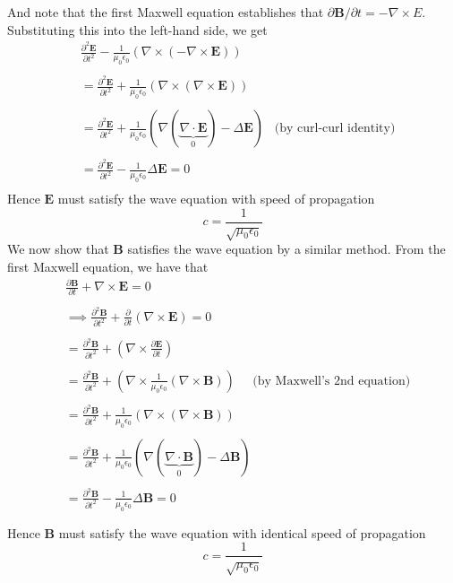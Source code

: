 \documentclass[12pt]{article}
\begin{document}
{And note that the first Maxwell equation establishes that $\partial \mathbf{B}/ \partial t = -\nabla \times E$. Substituting this into the left-hand side, we get \\
\begin{align*}
& \frac{\partial^2 \mathbf{E}}{\partial t^2} - \frac{1}{\mu_0 \epsilon_0} \left( \nabla \times \left( -\nabla \times \mathbf{E} \right) \right) \\ \\
&= \frac{\partial^2 \mathbf{E}}{\partial t^2} + \frac{1}{\mu_0 \epsilon_0} \left( \nabla \times \left( \nabla \times \mathbf{E} \right) \right) \\ \\
&= \frac{\partial^2 \mathbf{E}}{\partial t^2} + \frac{1}{\mu_0 \epsilon_0} \left( \nabla  ( \underbrace{\nabla \cdot \mathbf{E}}_{0}  ) - \Delta \mathbf{E}  \right) \;\;\; \text{(by curl-curl identity)} \\ \\
&= \frac{\partial^2 \mathbf{E}}{\partial t^2} - \frac{1}{\mu_0 \epsilon_0} \Delta \mathbf{E} = 0 \\
\end{align*}
Hence $\mathbf{E}$ must satisfy the wave equation with speed of propagation $$c = \frac{1}{\sqrt{\mu_0 \epsilon_0}}$$ 
We now show that $\mathbf{B}$ satisfies the wave equation by a similar method. From the first Maxwell equation, we have that \\
\[
\begin{aligned}
& \frac{\partial \mathbf{B}}{\partial t} + \nabla \times \mathbf{E} = 0 \\ \\
&\implies \frac{\partial^2 \mathbf{B}}{\partial t^2} + \frac{\partial}{\partial t} \left( \nabla \times \mathbf{E} \right) = 0 \\ \\
&= \frac{\partial^2 \mathbf{B}}{\partial t^2} + \left( \nabla \times \frac{\partial \mathbf{E}}{\partial t} \right)  \\ \\
&= \frac{\partial^2 \mathbf{B}}{\partial t^2} + \left( \nabla \times \frac{1}{\mu_0 \epsilon_0} (\nabla \times \mathbf{B}) \right) \;\;\;\;\; \text{(by Maxwell's 2nd equation)}  \\ \\
&= \frac{\partial^2 \mathbf{B}}{\partial t^2} + \frac{1}{\mu_0 \epsilon_0}  \left( \nabla \times (\nabla \times \mathbf{B}) \right) \\ \\
&= \frac{\partial^2 \mathbf{B}}{\partial t^2} + \frac{1}{\mu_0 \epsilon_0}  \left( \nabla  ( \underbrace{\nabla \cdot \mathbf{B}}_{0}  ) - \Delta \mathbf{B}  \right) \\ \\
&= \frac{\partial^2 \mathbf{B}}{\partial t^2} - \frac{1}{\mu_0 \epsilon_0} \Delta \mathbf{B} = 0 \\ \\
\end{aligned}
\]
Hence $\mathbf{B}$ must satisfy the wave equation with identical speed of propagation $$c = \frac{1}{\sqrt{\mu_0 \epsilon_0}}$$
}
\end{document}
